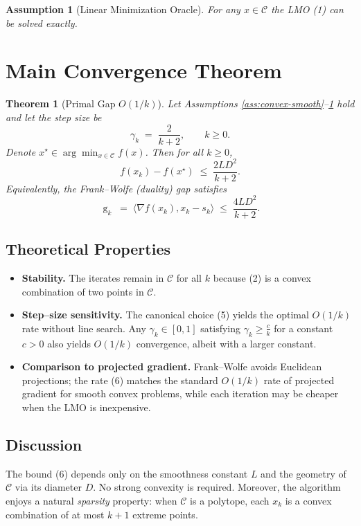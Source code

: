 \documentclass{article}
\newtheorem{theorem}{Theorem}
\newtheorem{assumption}{Assumption}
\newcommand{\gap}{\operatorname{g}}
\begin{document}
\begin{assumption}[Linear Minimization Oracle]\label{ass:lmo}
For any $x\in\mathcal{C}$ the LMO (1) can be solved exactly.
\end{assumption}

\section*{Main Convergence Theorem}
\begin{theorem}[Primal Gap $O(1/k)$]\label{thm:rate}
Let Assumptions \ref{ass:convex-smooth}–\ref{ass:lmo} hold and let the step size be
\[
\gamma_k \;=\; \frac{2}{k+2},\qquad k\ge0 .
\tag{5}
\]
Denote $x^\star\in\arg\min_{x\in\mathcal{C}}f(x)$.  
Then for all $k\ge0$,
\[
f(x_k)-f(x^\star) \;\le\; \frac{2L D^2}{k+2}.
\tag{6}
\]
Equivalently, the Frank–Wolfe (duality) gap satisfies
\[
\gap_k \;=\; \langle\nabla f(x_k),x_k-s_k\rangle \;\le\; \frac{4L D^2}{k+2}.
\tag{7}
\]
\end{theorem}

\subsection*{Theoretical Properties}
\begin{itemize}[leftmargin=*]
\item \textbf{Stability.} The iterates remain in $\mathcal{C}$ for all $k$ because (2) is a convex combination of two points in $\mathcal{C}$.
\item \textbf{Step–size sensitivity.} The canonical choice (5) yields the optimal $O(1/k)$ rate without line search. Any $\gamma_k\in[0,1]$ satisfying $\gamma_k\ge \frac{c}{k}$ for a constant $c>0$ also yields $O(1/k)$ convergence, albeit with a larger constant.
\item \textbf{Comparison to projected gradient.} Frank–Wolfe avoids Euclidean projections; the rate (6) matches the standard $O(1/k)$ rate of projected gradient for smooth convex problems, while each iteration may be cheaper when the LMO is inexpensive.
\end{itemize}

\subsection*{Discussion}
The bound (6) depends only on the smoothness constant $L$ and the geometry of $\mathcal{C}$ via its diameter $D$. No strong convexity is required. Moreover, the algorithm enjoys a natural \emph{sparsity} property: when $\mathcal{C}$ is a polytope, each $x_k$ is a convex combination of at most $k+1$ extreme points.
\end{document}
